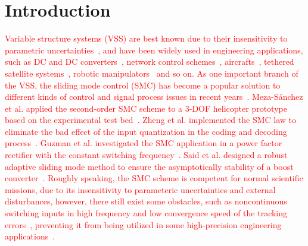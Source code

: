 \documentclass[3p]{elsarticle}
\theoremstyle{plain}
\theoremstyle{remark}
\begin{document}
\section{Introduction}
\textcolor{red}{Variable structure systems (VSS) are best known due to their insensitivity to parametric uncertainties~\cite{slotine1991applied}, and have been widely used in engineering applications, such as DC and DC converters~\cite{Tan2008General}, network control schemes~\cite{Hou2016}, aircrafts~\cite{Loza2015Sensor}, tethered satellite systems~\cite{Ma201667}, robotic manipulators~\cite{Beak2016A} and so on. As one important branch of the VSS, the sliding mode control (SMC) has become a popular solution to different kinds of control and signal process issues in recent years~\cite{zhao2015nonlinear,zhang2015attitude}. Meza-S{\'a}nchez et al. applied the second-order SMC scheme to a 3-DOF helicopter prototype based on the experimental test bed~\cite{meza2015output}. Zheng et al. implemented the SMC law to eliminate the bad effect of the input quantization in the coding and decoding process~\cite{zheng2016sliding}. Guzman et al. investigated the SMC application in a power factor rectifier with the constant switching frequency~\cite{guzman2016sliding}. Said et al. designed a robust adaptive sliding mode method to ensure the asymptotically stability of a boost converter~\cite{oucheriah2013pwm}. Roughly speaking, the SMC scheme is competent for normal scientific missions, due to its insensitivity to parameteric uncertainties and external disturbances, however, there still exist some obstacles, such as noncontinuous switching inputs in high frequency and low convergence speed of the tracking errors~\cite{boiko2013chattering,lee2009chattering}, preventing it from being utilized in some high-precision engineering applications~\cite{fridman2011sliding}.}
\end{document}
